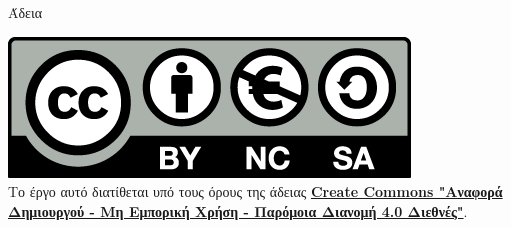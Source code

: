 \begin{frame}{}
    \begin{block}{Άδεια}
        \begin{center}
            \href{https://creativecommons.org/licenses/by-nc-sa/4.0/deed.el}{\includegraphics[scale=0.2]{images/cc.png}} \\
            Το έργο αυτό διατίθεται υπό τους όρους της άδειας \textbf{\href{https://creativecommons.org/licenses/by-nc-sa/4.0/deed.el}{Create Commons "Αναφορά Δημιουργού - Μη Εμπορική Χρήση - Παρόμοια Διανομή 4.0 Διεθνές"}}. \\ 
        \end{center}
    \end{block}
\end{frame}